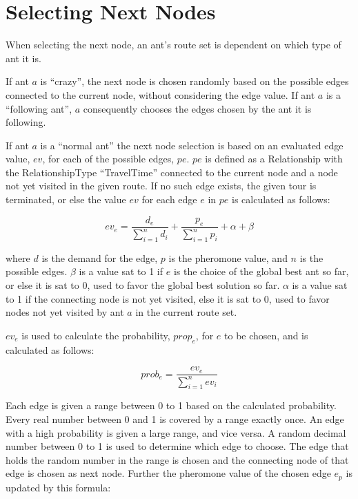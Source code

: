\section{Selecting Next Nodes}
\label{sec:selectingNextNode}

When selecting the next node, an ant's route set is dependent on which type of ant it is. 

If ant $a$ is ``crazy'', the next node is chosen randomly based on the possible edges connected to the current node, without considering the edge value. If ant $a$ is a ``following ant'', $a$ consequently chooses the edges chosen by the ant it is following.  

If ant $a$ is a ``normal ant'' the next node selection is based on an evaluated edge value, $ev$, for each of the possible edges, $pe$. $pe$ is defined as a Relationship with the RelationshipType ``TravelTime'' connected to the current node and a node not yet visited in the given route. If no such edge exists, the given tour is terminated, or else the value $ev$ for each edge $e$ in $pe$ is calculated as follows: 

$$ev_e = \frac{d_e}{\sum\limits^{n}_{i=1}d_i} + \frac{p_e}{\sum\limits^{n}_{i=1}p_i} + \alpha + \beta$$

where $d$ is the demand for the edge, $p$ is the pheromone value, and $n$ is the possible edges. $\beta$ is a value sat to 1 if $e$ is the choice of the global best ant so far, or else it is sat to 0, used to favor the global best solution so far. %
$\alpha$ is a value sat to 1 if the connecting node is not yet visited, else it is sat to 0, used to favor nodes not yet visited by ant $a$ in the current route set.  

$ev_e$ is used to calculate the probability, $prop_e$, for $e$ to be chosen, and is calculated as follows:

$$prob_e = \frac{ev_e}{\sum\limits^{n}_{i=1}ev_i}$$

Each edge is given a range between 0 to 1 based on the calculated probability. Every real number between 0 and 1 is covered by a range exactly once. An edge with a high probability is given a large range, and vice versa. A random decimal number between 0 to 1 is used to determine which edge to choose. The edge that holds the random number in the range is chosen and the connecting node of that edge is chosen as next node. Further the pheromone value of the chosen edge $e_p$ is updated by this formula:

